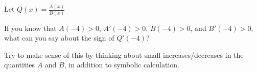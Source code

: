 \documentclass{ximera}
\author{Steven Gubkin}
\begin{document}
\begin{exercise}

Let $Q(x) = \frac{A(x)}{B(x)}$

If you know that $A(-4) > 0$, $A'(-4) > 0$, $B(-4) > 0$, and $B'(-4) > 0$, what can you say about the sign of $Q'(-4)$?

\begin{multipleChoice}
\end{multipleChoice}

Try to make sense of this by thinking about small increases/decreases in the quantities $A$ and $B$, in addition to symbolic calculation.

\end{exercise}
\end{document}
